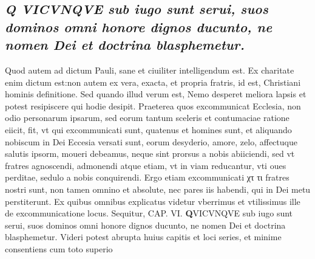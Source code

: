 \documentclass{article}
\begin{document}
\begin{pages}
\subsection*{\textit{Q VICVNQVE sub iugo sunt serui, suos dominos omni honore dignos ducunto, ne nomen Dei et doctrina blasphemetur.}}Quod autem ad dictum Pauli, sane et ciuiliter intelligendum est. Ex charitate enim dictum est:non autem ex vera, exacta, et propria fratris, id est, Christiani hominis definitione. Sed quando illud verum est, Nemo desperet meliora lapsis et potest resipiscere qui hodie desipit. Praeterea quos excommunicat Ecclesia, non odio personarum ipsarum, sed eorum tantum sceleris et contumaciae ratione eiicit, fit, vt qui excommunicati sunt, quatenus et homines sunt, et aliquando nobiscum in Dei Eccesia versati sunt, eorum desyderio, amore, zelo, affectuque salutis ipsorm, moueri debeamus, neque sint prorsus a nobis abiiciendi, sed vt fratres agnoscendi, admonendi atque etiam, vt in viam reducantur, vti oues perditae, sedulo a nobis conquirendi. Ergo etiam excommunicati χτ τι fratres nostri sunt, non tamen omnino et absolute, nec pares iis habendi, qui in Dei metu perstiterunt. Ex quibus omnibus explicatus videtur vberrimus et vtilissimus ille de excommunicatione locus. Sequitur, CAP. VI. 
\textbf{Q}VICVNQVE sub iugo sunt serui, suos dominos omni honore dignos ducunto, ne nomen Dei et doctrina blasphemetur. Videri potest abrupta huius capitis et loci series, et minime consentiens cum toto superio\pend
\endnumbering
\end{pages}
\end{document}
